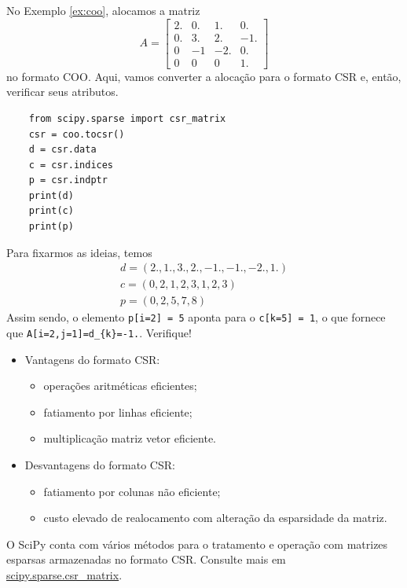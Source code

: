 \begin{ex}
  No Exemplo \ref{ex:coo}, alocamos a matriz
  \begin{equation}
    A =
    \begin{bmatrix}
      2. & 0. & 1.  & 0. \\
      0. & 3. & 2.  & -1.\\
      0  & -1 & -2. & 0. \\
      0  & 0  & 0   & 1.
    \end{bmatrix}
  \end{equation}
  no formato COO. Aqui, vamos converter a alocação para o formato CSR e, então, verificar seus atributos.
  \begin{lstlisting}
    from scipy.sparse import csr_matrix
    csr = coo.tocsr()
    d = csr.data
    c = csr.indices
    p = csr.indptr
    print(d)
    print(c)
    print(p)
  \end{lstlisting}
  Para fixarmos as ideias, temos
  \begin{gather}
    d = (2., 1., 3., 2., -1., -1., -2., 1.)\\
    c = (0, 2, 1, 2, 3, 1, 2, 3)\\
    p = (0, 2, 5, 7, 8)
  \end{gather}
  Assim sendo, o elemento \lstinline+p[i=2] = 5+ aponta para o \lstinline+c[k=5] = 1+, o que fornece que \lstinline+A[i=2,j=1]=d_{k}=-1.+. Verifique!
\end{ex}

\begin{itemize}
\item Vantagens do formato CSR:
  \begin{itemize}
  \item operações aritméticas eficientes;
  \item fatiamento por linhas eficiente;
  \item multiplicação matriz vetor eficiente.
  \end{itemize}
\item Desvantagens do formato CSR:
  \begin{itemize}
  \item fatiamento por colunas não eficiente;
  \item custo elevado de realocamento com alteração da esparsidade da matriz.
  \end{itemize}
\end{itemize}

\begin{obs}
  O SciPy conta com vários métodos para o tratamento e operação com matrizes esparsas armazenadas no formato CSR. Consulte mais em \href{https://docs.scipy.org/doc/scipy/reference/generated/scipy.sparse.csr_matrix.html}{scipy.sparse.csr\_matrix}.
\end{obs}

